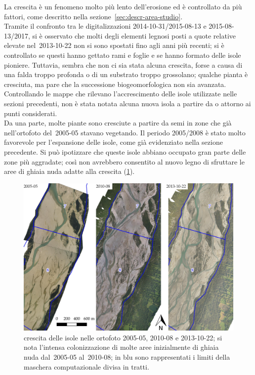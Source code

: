 La crescita è un fenomeno molto più lento dell'erosione ed è controllato da più fattori, come descritto nella sezione~\ref{sec:descr-area-studio}.
\\
Tramite il confronto tra le digitalizzazioni 2014-10-31/2015-08-13 e 2015-08-13/2017, si è osservato che molti degli elementi legnosi posti a quote relative elevate nel~2013-10-22 non si sono spostati fino agli anni più recenti; si è controllato se questi hanno gettato rami e foglie e se hanno formato delle isole pioniere.
Tuttavia, sembra che non ci sia stata alcuna crescita, forse a causa di una falda troppo profonda o di un substrato troppo grossolano; qualche pianta è cresciuta, ma pare che la successione biogeomorfologica non sia avanzata.
Controllando le mappe che rilevano l'accrescimento delle isole utilizzate nelle sezioni precedenti, non è stata notata alcuna nuova isola a partire da o attorno ai punti considerati.
\\
Da una parte, molte piante sono cresciute a partire da semi in zone che già nell'ortofoto del~2005-05 stavano vegetando. Il periodo 2005/2008 è stato molto favorevole per l'espansione delle isole, come già evidenziato nella sezione precedente.
Si può ipotizzare che queste isole abbiano occupato gran parte delle zone più aggradate; così non avrebbero consentito al nuovo legno di sfruttare le aree di ghiaia nuda adatte alla crescita (\cref{fig:crescita-2005-2010-2013}).
%
\begin{figure}
	\centering
	\includegraphics[width = \textwidth]{files/crescita_2005_2010_2013.jpeg}
	\caption[crescita delle isole confrontando le ortofoto 2005-05, 2010-08 e 2013-10-22]{crescita delle isole nelle ortofoto 2005-05, 2010-08 e 2013-10-22; si nota l'intensa colonizzazione di molte aree inizialmente di ghiaia nuda dal~2005-05 al~2010-08; in blu sono rappresentati i limiti della maschera computazionale divisa in tratti.}
	\label{fig:crescita-2005-2010-2013}
\end{figure}
%
